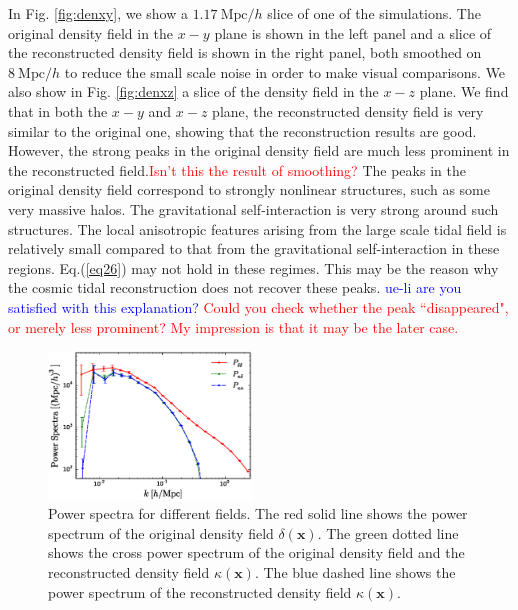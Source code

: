 \documentclass[aps,prd,twocolumn,showpacs,superscriptaddress,groupedaddress,nofootinbib]{revtex4}  %
\newcommand{\mr}{\mathrm}
\begin{document}
In Fig. \ref{fig:denxy}, we show a $1.17\ \mr{Mpc/}h$ 
slice of one of the simulations. The original density field in the $x-y$ plane is shown
 in the left panel and  a slice of the reconstructed density field is shown in the right panel, 
both smoothed on $8\ \mr{Mpc}/h$ to reduce the small scale noise 
in order to make visual comparisons. We also  show in Fig. \ref{fig:denxz}  
a slice of the density field in the $x-z$ plane. We find that in both the $x-y$ and $x-z$ 
plane, the reconstructed density field is very similar to the original one, showing that the reconstruction results are good. However, the strong peaks in the original density 
field are much less prominent in the reconstructed field.\textcolor{red}{Isn't this the result
of smoothing?}
The peaks in the original density field correspond to strongly nonlinear 
structures, such as some very massive halos. The gravitational self-interaction is 
very strong around such structures. The local anisotropic features arising from the 
large scale tidal field is relatively small compared to that from the gravitational 
self-interaction in these regions. Eq.(\ref{eq26}) may not hold in these regimes.
This may be the reason why the cosmic tidal reconstruction does not recover these peaks.
\textcolor{blue}{ue-li are you satisfied with this explanation?}
\textcolor{red}{Could you check whether the peak ``disappeared", or merely less prominent?
My impression is that it may be the later case. }


\begin{figure}[tbp]
\begin{center}
\includegraphics[width=0.48\textwidth]{fig1b.eps}
\end{center}
\vspace{-0.7cm}
\caption{\label{fig:1} Power spectra for different fields. The red solid line
shows the power spectrum of the original density field $\delta(\bm{x})$. 
The green dotted line shows the cross power spectrum of the original density
field and the reconstructed density field $\kappa(\bm{x})$. The blue dashed
line shows the power spectrum of the reconstructed density field 
$\kappa(\bm{x})$.}
\end{figure}
\end{document}
